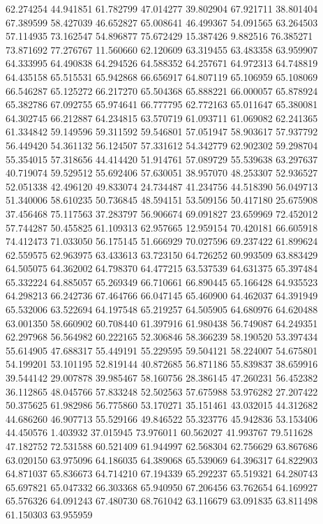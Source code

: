 62.274254
44.941851
61.782799
47.014277
39.802904
67.921711
38.801404
67.389599
58.427039
46.652827
65.008641
46.499367
54.091565
63.264503
57.114935
73.162547
54.896877
75.672429
15.387426
9.882516
76.385271
73.871692
77.276767
11.560660
62.120609
63.319455
63.483358
63.959907
64.333995
64.490838
64.294526
64.588352
64.257671
64.972313
64.748819
64.435158
65.515531
65.942868
66.656917
64.807119
65.106959
65.108069
66.546287
65.125272
66.217270
65.504368
65.888221
66.000057
65.878924
65.382786
67.092755
65.974641
66.777795
62.772163
65.011647
65.380081
64.302745
66.212887
64.234815
63.570719
61.093711
61.069082
62.241365
61.334842
59.149596
59.311592
59.546801
57.051947
58.903617
57.937792
56.449420
54.361132
56.124507
57.331612
54.342779
62.902302
59.298704
55.354015
57.318656
44.414420
51.914761
57.089729
55.539638
63.297637
40.719074
59.529512
55.692406
57.630051
38.957070
48.253307
52.936527
52.051338
42.496120
49.833074
24.734487
41.234756
44.518390
56.049713
51.340006
58.610235
50.736845
48.594151
53.509156
50.417180
25.675908
37.456468
75.117563
37.283797
56.906674
69.091827
23.659969
72.452012
57.744287
50.455825
61.109313
62.957665
12.959154
70.420181
66.605918
74.412473
71.033050
56.175145
51.666929
70.027596
69.237422
61.899624
62.559575
62.963975
63.433613
63.723150
64.726252
60.993509
63.883429
64.505075
64.362002
64.798370
64.477215
63.537539
64.631375
65.397484
65.332224
64.885057
65.269349
66.710661
66.890445
65.166428
64.935523
64.298213
66.242736
67.464766
66.047145
65.460900
64.462037
64.391949
65.532006
63.522694
64.197548
65.219257
64.505905
64.680976
64.620488
63.001350
58.660902
60.708440
61.397916
61.980438
56.749087
64.249351
62.297968
56.564982
60.222165
52.306846
58.366239
58.190520
53.397434
55.614905
47.688317
55.449191
55.229595
59.504121
58.224007
54.675801
54.199201
53.101195
52.819144
40.872685
56.871186
55.839837
38.659916
39.544142
29.007878
39.985467
58.160756
28.386145
47.260231
56.452382
36.112865
48.045766
57.833248
52.502563
57.675988
53.976282
27.207422
50.375625
61.982986
56.775860
53.170271
35.151461
43.032015
44.312682
44.686260
46.907713
55.529166
49.846522
55.323776
45.942836
53.153406
44.450576
1.403932
37.015945
73.976011
60.562027
41.993767
79.511628
47.182752
72.531588
60.521409
61.944997
62.568304
62.756629
63.867686
63.020150
63.975096
64.186035
64.389068
65.539069
64.396317
64.822903
64.871037
65.836673
64.714210
67.194339
65.292237
65.519321
64.280743
65.697821
65.047332
66.303368
65.940950
67.206456
63.762654
64.169927
65.576326
64.091243
67.480730
68.761042
63.116679
63.091835
63.811498
61.150303
63.955959
